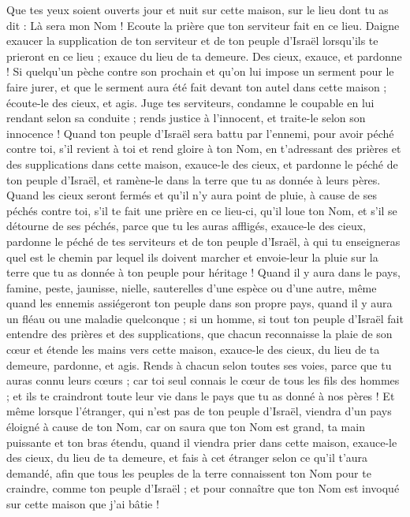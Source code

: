 \begin{multicols}{2}
Que tes yeux soient ouverts jour et nuit sur cette maison, sur le lieu dont tu as dit : Là sera mon Nom ! Ecoute la prière que ton serviteur fait en ce lieu.
Daigne exaucer la supplication de ton serviteur et de ton peuple d'Israël lorsqu’ils te prieront en ce lieu ; exauce du lieu de ta demeure. Des cieux, exauce, et pardonne !
Si quelqu'un pèche contre son prochain et qu’on lui impose un serment pour le faire jurer, et que le serment aura été fait devant ton autel dans cette maison ;
écoute-le des cieux, et agis. Juge tes serviteurs, condamne le coupable en lui rendant selon sa conduite ; rends justice à l’innocent, et traite-le selon son innocence !
Quand ton peuple d'Israël sera battu par l'ennemi, pour avoir péché contre toi, s’il revient à toi et rend gloire à ton Nom, en t’adressant des prières et des supplications dans cette maison,
exauce-le des cieux, et pardonne le péché de ton peuple d'Israël, et ramène-le dans la terre que tu as donnée à leurs pères.
Quand les cieux seront fermés et qu'il n'y aura point de pluie, à cause de ses péchés contre toi, s'il te fait une prière en ce lieu-ci, qu’il loue ton Nom, et s’il se détourne de ses péchés, parce que tu les auras affligés,
exauce-le des cieux, pardonne le péché de tes serviteurs et de ton peuple d'Israël, à qui tu enseigneras quel est le chemin par lequel ils doivent marcher et envoie-leur la pluie sur la terre que tu as donnée à ton peuple pour héritage !
Quand il y aura dans le pays, famine, peste, jaunisse, nielle, sauterelles d’une espèce ou d’une autre, même quand les ennemis assiégeront ton peuple dans son propre pays, quand il y aura un fléau ou une maladie quelconque ;
si un homme, si tout ton peuple d'Israël fait entendre des prières et des supplications, que chacun reconnaisse la plaie de son cœur et étende les mains vers cette maison,
exauce-le des cieux, du lieu de ta demeure, pardonne, et agis. Rends à chacun selon toutes ses voies, parce que tu auras connu leurs cœurs ; car toi seul connais le cœur de tous les fils des hommes ;
et ils te craindront toute leur vie dans le pays que tu as donné à nos pères !
Et même lorsque l'étranger, qui n’est pas de ton peuple d'Israël, viendra d'un pays éloigné à cause de ton Nom,
car on saura que ton Nom est grand, ta main puissante et ton bras étendu, quand il viendra prier dans cette maison,
exauce-le des cieux, du lieu de ta demeure, et fais à cet étranger selon ce qu’il t’aura demandé, afin que tous les peuples de la terre connaissent ton Nom pour te craindre, comme ton peuple d'Israël ; et pour connaître que ton Nom est invoqué sur cette maison que j'ai bâtie !

\end{multicols}
